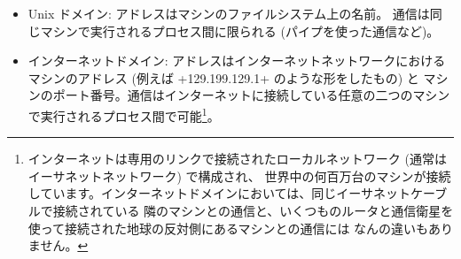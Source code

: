 \begin{itemize}
\item Unix ドメイン:
  アドレスはマシンのファイルシステム上の名前。
  通信は同じマシンで実行されるプロセス間に限られる (パイプを使った通信など)。
%
\item インターネットドメイン:
  アドレスはインターネットネットワークにおけるマシンのアドレス (例えば \ml+129.199.129.1+ のような形をしたもの) と
  マシンのポート番号。通信はインターネットに接続している任意の二つのマシンで実行されるプロセス間で可能\footnote{
    インターネットは専用のリンクで接続されたローカルネットワーク (通常はイーサネットネットワーク) で構成され、
    世界中の何百万台のマシンが接続しています。インターネットドメインにおいては、同じイーサネットケーブルで接続されている
    隣のマシンとの通信と、いくつものルータと通信衛星を使って接続された地球の反対側にあるマシンとの通信には
    なんの違いもありません。}。
\end{itemize}

